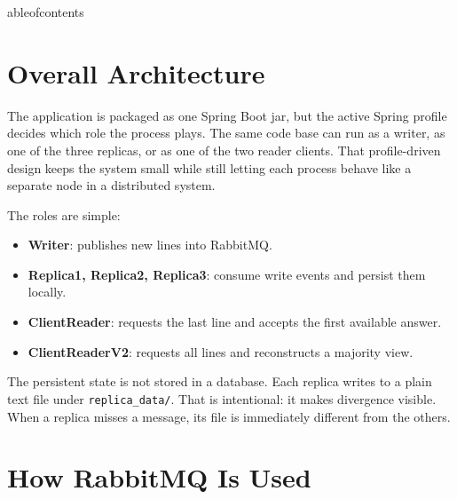 \documentclass[11pt]{article}
\author{Technical Documentation}
\date{\today}
\begin{document}
\maketitle

\begin{abstract}
This project is a small replication system built with Spring Boot and RabbitMQ. It uses one writer, three replicas, and two reader modes to demonstrate how a distributed system can either favor fast availability or a more reconciled view of the data. The explanation below follows the real code paths in the project and describes what happens in each scenario in natural language.
\end{abstract}

	ableofcontents

\section{Overall Architecture}

The application is packaged as one Spring Boot jar, but the active Spring profile decides which role the process plays. The same code base can run as a writer, as one of the three replicas, or as one of the two reader clients. That profile-driven design keeps the system small while still letting each process behave like a separate node in a distributed system.

The roles are simple:
\begin{itemize}[leftmargin=1.4em]
  \item \textbf{Writer}: publishes new lines into RabbitMQ.
  \item \textbf{Replica1, Replica2, Replica3}: consume write events and persist them locally.
  \item \textbf{ClientReader}: requests the last line and accepts the first available answer.
  \item \textbf{ClientReaderV2}: requests all lines and reconstructs a majority view.
\end{itemize}

The persistent state is not stored in a database. Each replica writes to a plain text file under \texttt{replica\_data/}. That is intentional: it makes divergence visible. When a replica misses a message, its file is immediately different from the others.

\section{How RabbitMQ Is Used}
\end{document}
